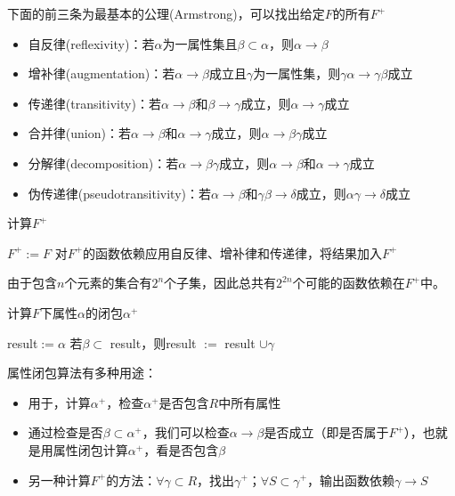 \begin{theorem}[逻辑蕴含公理]
下面的前三条为最基本的公理(Armstrong)，可以找出给定$F$的所有$F^+$
\begin{itemize}
	\item 自反律(reflexivity)：若$\alpha$为一属性集且$\beta\subset\alpha$，则$\alpha\to\beta$
	\item 增补律(augmentation)：若$\alpha\to\beta$成立且$\gamma$为一属性集，则$\gamma\alpha\to\gamma\beta$成立
	\item 传递律(transitivity)：若$\alpha\to\beta$和$\beta\to\gamma$成立，则$\alpha\to\gamma$成立
	\item 合并律(union)：若$\alpha\to\beta$和$\alpha\to\gamma$成立，则$\alpha\to\beta\gamma$成立
	\item 分解律(decomposition)：若$\alpha\to\beta\gamma$成立，则$\alpha\to\beta$和$\alpha\to\gamma$成立
	\item 伪传递律(pseudotransitivity)：若$\alpha\to\beta$和$\gamma\beta\to\delta$成立，则$\alpha\gamma\to\delta$成立
\end{itemize}
\end{theorem}

\begin{algorithm}
\caption{计算$F^+$}
\begin{algorithmic}[1]
\State $F^+:=F$
\Repeat
\State 对$F^+$的函数依赖应用自反律、增补律和传递律，将结果加入$F^+$
\end{algorithmic}
\end{algorithm}
由于包含$n$个元素的集合有$2^n$个子集，因此总共有$2^{2n}$个可能的函数依赖在$F^+$中。

\begin{algorithm}[H]
\caption{计算$F$下属性$\alpha$的闭包$\alpha^+$}
\begin{algorithmic}[1]
\State result$:=\alpha$
\Repeat
{}
\State 若$\beta\subset$ result，则result $:=$ result $\cup\gamma$
\EndFor
{}
\end{algorithmic}
\end{algorithm}

属性闭包算法有多种用途：
\begin{itemize}
	\item 用于，计算$\alpha^+$，检查$\alpha^+$是否包含$R$中所有属性
	\item 通过检查是否$\beta\subset\alpha^+$，我们可以检查$\alpha\to\beta$是否成立（即是否属于$F^+$），也就是用属性闭包计算$\alpha^+$，看是否包含$\beta$
	\item 另一种计算$F^+$的方法：$\forall\gamma\subset R$，找出$\gamma^+$；$\forall S\subset\gamma^+$，输出函数依赖$\gamma\to S$
\end{itemize}

